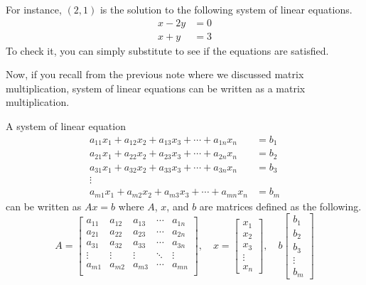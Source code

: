 \documentclass[../main.tex]{subfiles}
\begin{document}
For instance, $(2, 1)$ is the solution to the following system of
linear equations.
\begin{align*}
    x - 2y &= 0 \\
    x + y  &= 3
\end{align*}
To check it, you can simply substitute to see if the equations are
satisfied.

Now, if you recall from the previous note where we discussed matrix
multiplication, system of linear equations can be written as a
matrix multiplication.

\begin{definition}
A system of linear equation
\begin{align*}
    a_{11}x_1 + a_{12}x_2 + a_{13}x_3 + \cdots + a_{1n}x_n &= b_1 \\
    a_{21}x_1 + a_{22}x_2 + a_{23}x_3 + \cdots + a_{2n}x_n &= b_2 \\
    a_{31}x_1 + a_{32}x_2 + a_{33}x_3 + \cdots + a_{3n}x_n &= b_3 \\
    \vdots\qquad\qquad& \\
    a_{m1}x_1 + a_{m2}x_2 + a_{m3}x_3 + \cdots + a_{mn}x_n &= b_m
\end{align*}
can be written as $Ax = b$ where $A$, $x$, and $b$ are matrices
defined as the following.
\[
A =
\begin{bmatrix}
    a_{11} & a_{12} & a_{13} & \cdots & a_{1n} \\
    a_{21} & a_{22} & a_{23} & \cdots & a_{2n} \\
    a_{31} & a_{32} & a_{33} & \cdots & a_{3n} \\
    \vdots & \vdots & \vdots & \ddots & \vdots \\
    a_{m1} & a_{m2} & a_{m3} & \cdots & a_{mn} \\
\end{bmatrix},
\quad
x =
\begin{bmatrix}
    x_1 \\
    x_2 \\
    x_3 \\
    \vdots \\
    x_n
\end{bmatrix},
\quad
b
\begin{bmatrix}
    b_1 \\
    b_2 \\
    b_3 \\
    \vdots \\
    b_m
\end{bmatrix}
\]
\end{definition}
\end{document}
